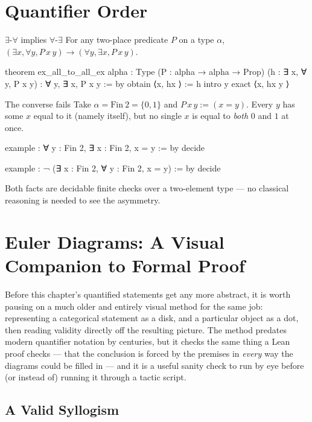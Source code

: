 \section{Quantifier Order}

\begin{experiment}{$\exists$-$\forall$ implies $\forall$-$\exists$}
For any two-place predicate $P$ on a type $\alpha$,
$(\exists x, \forall y, P\,x\,y) \to (\forall y, \exists x, P\,x\,y)$.
\begin{lean}
theorem ex_all_to_all_ex {alpha : Type} (P : alpha → alpha → Prop)
    (h : ∃ x, ∀ y, P x y) : ∀ y, ∃ x, P x y := by
  obtain ⟨x, hx ⟩ := h
  intro y
  exact ⟨x, hx y ⟩
\end{lean}
\end{experiment}

\begin{countermodel}{The converse fails}
Take $\alpha = \mathrm{Fin}\ 2 = \{0,1\}$ and $P\,x\,y := (x = y)$.
Every $y$ has some $x$ equal to it (namely itself), but no single $x$
is equal to \emph{both} $0$ and $1$ at once.
\begin{lean}
example : ∀ y : Fin 2, ∃ x : Fin 2, x = y := by decide

example : ¬ (∃ x : Fin 2, ∀ y : Fin 2, x = y) := by decide
\end{lean}
Both facts are decidable finite checks over a two-element type — no
classical reasoning is needed to see the asymmetry.
\end{countermodel}

\section{Euler Diagrams: A Visual Companion to Formal Proof}
\label{sec:euler-diagrams}

Before this chapter's quantified statements get any more abstract,
it is worth pausing on a much older and entirely visual method for
the same job: representing a categorical statement as a disk, and a
particular object as a dot, then reading validity directly off the
resulting picture. The method predates modern quantifier notation by
centuries, but it checks the same thing a Lean proof checks — that
the conclusion is forced by the premises in \emph{every} way the
diagrams could be filled in — and it is a useful sanity check to run
by eye before (or instead of) running it through a tactic script.

\subsection{A Valid Syllogism}

